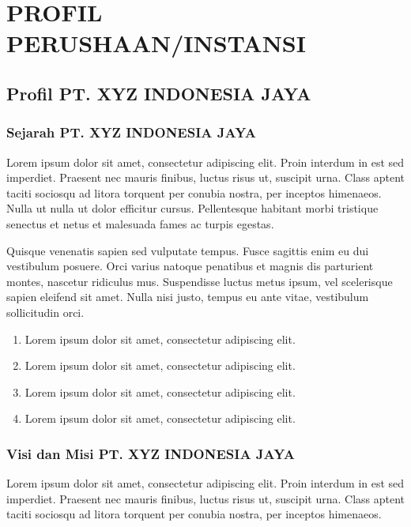 \chapter{PROFIL PERUSHAAN/INSTANSI}

\section{Profil PT. XYZ INDONESIA JAYA}

\subsection{Sejarah PT. XYZ INDONESIA JAYA}
Lorem ipsum dolor sit amet, consectetur adipiscing elit. Proin interdum in est sed imperdiet. Praesent nec mauris finibus, luctus risus ut, suscipit urna. Class aptent taciti sociosqu ad litora torquent per conubia nostra, per inceptos himenaeos. Nulla ut nulla ut dolor efficitur cursus. Pellentesque habitant morbi tristique senectus et netus et malesuada fames ac turpis egestas.

Quisque venenatis sapien sed vulputate tempus. Fusce sagittis enim eu dui vestibulum posuere. Orci varius natoque penatibus et magnis dis parturient montes, nascetur ridiculus mus. Suspendisse luctus metus ipsum, vel scelerisque sapien eleifend sit amet. Nulla nisi justo, tempus eu ante vitae, vestibulum sollicitudin orci.
\begin{enumerate}
    \item Lorem ipsum dolor sit amet, consectetur adipiscing elit.
    \item Lorem ipsum dolor sit amet, consectetur adipiscing elit.
    \item Lorem ipsum dolor sit amet, consectetur adipiscing elit.
    \item Lorem ipsum dolor sit amet, consectetur adipiscing elit.
\end{enumerate}

\subsection{Visi dan Misi PT. XYZ INDONESIA JAYA}
Lorem ipsum dolor sit amet, consectetur adipiscing elit. Proin interdum in est sed imperdiet. Praesent nec mauris finibus, luctus risus ut, suscipit urna. Class aptent taciti sociosqu ad litora torquent per conubia nostra, per inceptos himenaeos.

